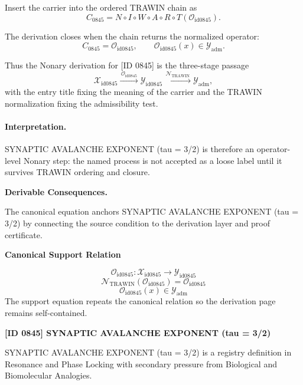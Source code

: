 Insert the carrier into the ordered TRAWIN chain as\[
C_{0845}=N\circ I\circ W\circ A\circ R\circ T(\mathcal{O}_{\mathrm{id0845}}).
\]

The derivation closes when the chain returns the normalized operator:\[
C_{0845}=\mathcal{O}_{\mathrm{id0845}},\qquad \mathcal{O}_{\mathrm{id0845}}(x)\in\mathcal{Y}_{\mathrm{adm}}.
\]

Thus the Nonary derivation for [ID 0845] is the three-stage passage
\[
\mathcal{X}_{\mathrm{id0845}}\xrightarrow{\,\mathcal{O}_{\mathrm{id0845}}\,} \mathcal{Y}_{\mathrm{id0845}}\xrightarrow{\,\mathcal{N}_{\mathrm{TRAWIN}}\,} \mathcal{Y}_{\mathrm{adm}},
\]
with the entry title fixing the meaning of the carrier and the TRAWIN normalization fixing the admissibility test.

\paragraph{Interpretation.} SYNAPTIC AVALANCHE EXPONENT (tau = 3/2) is therefore an operator-level Nonary step: the named process is not accepted as a loose label until it survives TRAWIN ordering and closure.

\par\vspace{0.35em}
\noindent\textbf{Derivable Consequences.}\quad
\begingroup
\footnotesize
\raggedright
The canonical equation anchors SYNAPTIC AVALANCHE EXPONENT (tau = 3/2) by connecting the source condition to the derivation layer and proof certificate.
\par\endgroup

\noindent\textbf{Canonical Support Relation}\par
\[
\mathcal{O}_{\mathrm{id0845}}:\mathcal{X}_{\mathrm{id0845}}\longrightarrow\mathcal{Y}_{\mathrm{id0845}}
\]
\[
\mathcal{N}_{\mathrm{TRAWIN}}(\mathcal{O}_{\mathrm{id0845}})=\mathcal{O}_{\mathrm{id0845}}
\]
\[
\mathcal{O}_{\mathrm{id0845}}(x)\in\mathcal{Y}_{\mathrm{adm}}
\]
\noindent The support equation repeats the canonical relation so the derivation page remains self-contained.\par

\clearpage
\noindent\textbf{[ID 0845] SYNAPTIC AVALANCHE EXPONENT (tau = 3/2)}\par
\vspace{0.35em}
\begingroup\small
{}
SYNAPTIC AVALANCHE EXPONENT (tau = 3/2) is a registry definition in Resonance and Phase Locking with secondary pressure from Biological and Biomolecular Analogies.

